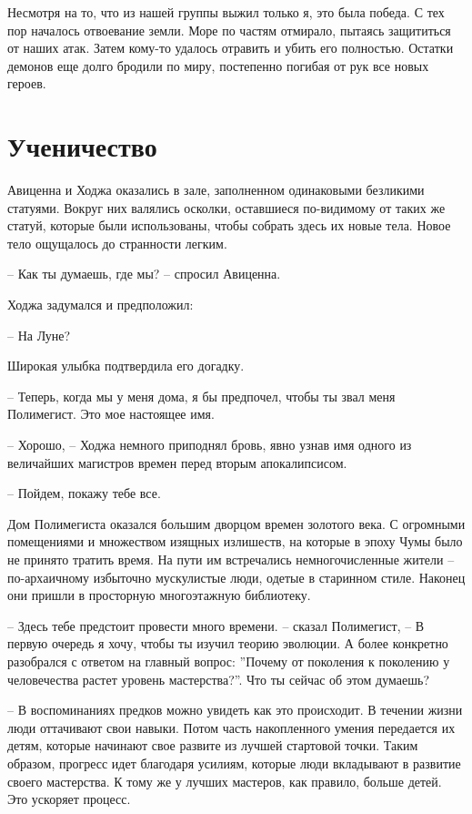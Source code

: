\documentclass[12pt,a4paper]{article}
\begin{document}
Несмотря на то, что из нашей группы выжил только я, это была победа. С тех пор началось отвоевание земли. Море по частям отмирало, пытаясь защититься от наших атак. Затем кому-то удалось отравить и убить его полностью. Остатки демонов еще долго бродили по миру, постепенно погибая от рук все новых героев.

\section*{Ученичество}

Авиценна и Ходжа оказались в зале, заполненном одинаковыми безликими статуями. Вокруг них валялись осколки, оставшиеся по-видимому от таких же статуй, которые были использованы, чтобы собрать здесь их новые тела. Новое тело ощущалось до странности легким.

-- Как ты думаешь, где мы? -- спросил Авиценна.

Ходжа задумался и предположил:

-- На Луне?

Широкая улыбка подтвердила его догадку.

-- Теперь, когда мы у меня дома, я бы предпочел, чтобы ты звал меня Полимегист. Это мое настоящее имя.

-- Хорошо, -- Ходжа немного приподнял бровь, явно узнав имя одного из величайших магистров времен перед вторым апокалипсисом.

-- Пойдем, покажу тебе все.

Дом Полимегиста оказался большим дворцом времен золотого века. С огромными помещениями и множеством изящных излишеств, на которые в эпоху Чумы было не принято тратить время. На пути им встречались немногочисленные жители -- по-архаичному избыточно мускулистые люди, одетые в старинном стиле. Наконец они пришли в просторную многоэтажную библиотеку.

-- Здесь тебе предстоит провести много времени. -- сказал Полимегист, -- В первую очередь я хочу, чтобы ты изучил теорию эволюции. А более конкретно разобрался с ответом на главный вопрос: ''Почему от поколения к поколению у человечества растет уровень мастерства?''. Что ты сейчас об этом думаешь?

-- В воспоминаниях предков можно увидеть как это происходит. В течении жизни люди оттачивают свои навыки. Потом часть накопленного умения передается их детям, которые начинают свое развите из лучшей стартовой точки. Таким образом, прогресс идет благодаря усилиям, которые люди вкладывают в развитие своего мастерства. К тому же у лучших мастеров, как правило, больше детей. Это ускоряет процесс.
\end{document}
